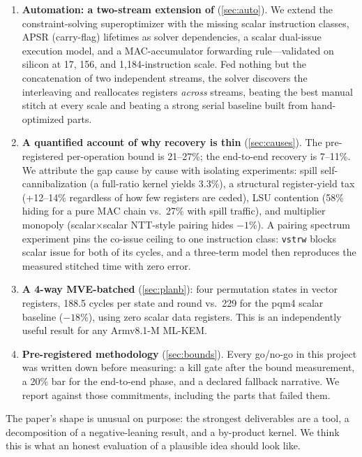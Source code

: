 \documentclass[11pt,a4paper]{article}
\begin{document}
\begin{enumerate}[leftmargin=*]
\item \textbf{Automation: a two-stream extension of \slothy{}}
      (\cref{sec:auto}). We extend the constraint-solving superoptimizer
      \cite{Slothy22} with the missing scalar instruction classes, APSR
      (carry-flag) lifetimes as solver dependencies, a scalar dual-issue
      execution model, and a MAC-accumulator forwarding rule---validated on
      silicon at 17, 156, and 1,184-instruction scale. Fed nothing but the
      concatenation of two independent streams, the solver discovers the
      interleaving and reallocates registers \emph{across} streams, beating the
      best manual stitch at every scale and beating a strong serial baseline
      built from hand-optimized parts.
\item \textbf{A quantified account of why recovery is thin}
      (\cref{sec:causes}). The pre-registered per-operation bound is 21--27\%;
      the end-to-end recovery is 7--11\%. We attribute the gap cause by cause
      with isolating experiments: spill self-cannibalization (a full-ratio
      kernel yields 3.3\%), a structural register-yield tax (+12--14\%
      regardless of how few registers are ceded), LSU contention (58\% hiding
      for a pure MAC chain vs.\ 27\% with spill traffic), and multiplier
      monopoly (scalar$\times$scalar NTT-style pairing hides $-1$\%). A pairing
      spectrum experiment pins the co-issue ceiling to one instruction class:
      \texttt{vstrw} blocks scalar issue for both of its cycles, and a
      three-term model then reproduces the measured stitched time with zero
      error.
\item \textbf{A 4-way MVE-batched \keccak{}} (\cref{sec:planb}): four
      permutation states in vector registers, 188.5 cycles per state and round
      vs.\ 229 for the pqm4 scalar baseline ($-18$\%), using zero scalar data registers.
      This is an independently useful result for any Armv8.1-M ML-KEM.
\item \textbf{Pre-registered methodology} (\cref{sec:bounds}). Every
      go/no-go in this project was written down before measuring: a kill gate
      after the bound measurement, a 20\% bar for the end-to-end phase, and a
      declared fallback narrative. We report against those commitments,
      including the parts that failed them.
\end{enumerate}

The paper's shape is unusual on purpose: the strongest deliverables are a tool,
a decomposition of a negative-leaning result, and a by-product kernel. We think
this is what an honest evaluation of a plausible idea should look like.
\end{document}
